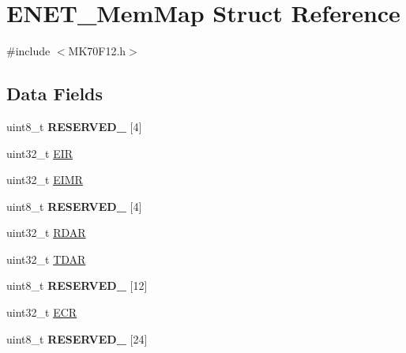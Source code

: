 \hypertarget{struct_e_n_e_t___mem_map}{}\section{E\+N\+E\+T\+\_\+\+Mem\+Map Struct Reference}
\label{struct_e_n_e_t___mem_map}


{\ttfamily \#include $<$M\+K70\+F12.\+h$>$}

\subsection*{Data Fields}
\begin{DoxyCompactItemize}
\item 
\hypertarget{struct_e_n_e_t___mem_map_a31e96a213ae2c334edf14d75f264e4a0}{}uint8\+\_\+t {\bfseries R\+E\+S\+E\+R\+V\+E\+D\+\_} \mbox{[}4\mbox{]}\label{struct_e_n_e_t___mem_map_a31e96a213ae2c334edf14d75f264e4a0}

\item 
uint32\+\_\+t \hyperlink{struct_e_n_e_t___mem_map_a29d8a8af55bce6f1482fc85b39ead867}{E\+I\+R}
\item 
uint32\+\_\+t \hyperlink{struct_e_n_e_t___mem_map_afc82bb113d2a15c34b9704d14d52bde7}{E\+I\+M\+R}
\item 
\hypertarget{struct_e_n_e_t___mem_map_a852744c908731c9db3d055dc766ccce8}{}uint8\+\_\+t {\bfseries R\+E\+S\+E\+R\+V\+E\+D\+\_} \mbox{[}4\mbox{]}\label{struct_e_n_e_t___mem_map_a852744c908731c9db3d055dc766ccce8}

\item 
uint32\+\_\+t \hyperlink{struct_e_n_e_t___mem_map_ac81db3c26b1cda460f57d07a6ec530e8}{R\+D\+A\+R}
\item 
uint32\+\_\+t \hyperlink{struct_e_n_e_t___mem_map_abc933198128768f22ed4f8acec589c2f}{T\+D\+A\+R}
\item 
\hypertarget{struct_e_n_e_t___mem_map_a3ad7a85e2eee4a8d3c242268fb6e3297}{}uint8\+\_\+t {\bfseries R\+E\+S\+E\+R\+V\+E\+D\+\_} \mbox{[}12\mbox{]}\label{struct_e_n_e_t___mem_map_a3ad7a85e2eee4a8d3c242268fb6e3297}

\item 
uint32\+\_\+t \hyperlink{struct_e_n_e_t___mem_map_acecfb77364c642e2f4c404101154b84e}{E\+C\+R}
\item 
\hypertarget{struct_e_n_e_t___mem_map_a85ca8798a18d300a4d129a9eed46e380}{}uint8\+\_\+t {\bfseries R\+E\+S\+E\+R\+V\+E\+D\+\_} \mbox{[}24\mbox{]}\label{struct_e_n_e_t___mem_map_a85ca8798a18d300a4d129a9eed46e380}


\end{DoxyCompactItemize}
